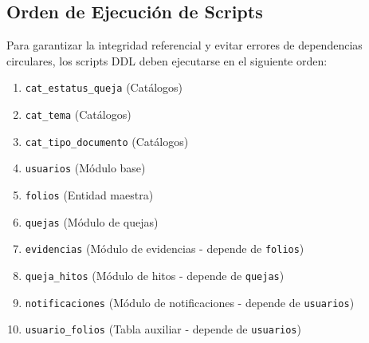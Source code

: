 
\subsection{Orden de Ejecuci\'on de Scripts}
Para garantizar la integridad referencial y evitar errores de dependencias circulares, los scripts DDL deben ejecutarse en el siguiente orden:

\begin{enumerate}
    \item \texttt{cat\_estatus\_queja} (Cat\'alogos)
    \item \texttt{cat\_tema} (Cat\'alogos)
    \item \texttt{cat\_tipo\_documento} (Cat\'alogos)
    \item \texttt{usuarios} (M\'odulo base)
    \item \texttt{folios} (Entidad maestra)
    \item \texttt{quejas} (M\'odulo de quejas)
    \item \texttt{evidencias} (M\'odulo de evidencias - depende de \texttt{folios})
    \item \texttt{queja\_hitos} (M\'odulo de hitos - depende de \texttt{quejas})
    \item \texttt{notificaciones} (M\'odulo de notificaciones - depende de \texttt{usuarios})
    \item \texttt{usuario\_folios} (Tabla auxiliar - depende de \texttt{usuarios})
\end{enumerate}

\begin{center}
\end{center}

